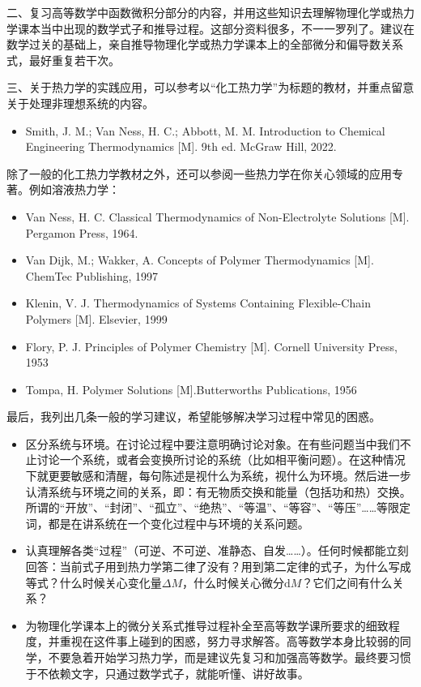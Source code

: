 \documentclass[main.tex]{subfiles}
\begin{document}
二、复习高等数学中函数微积分部分的内容，并用这些知识去理解物理化学或热力学课本当中出现的数学式子和推导过程。这部分资料很多，不一一罗列了。建议在数学过关的基础上，亲自推导物理化学或热力学课本上的全部微分和偏导数关系式，最好重复若干次。

三、关于热力学的实践应用，可以参考以“化工热力学”为标题的教材，并重点留意关于处理非理想系统的内容。
\begin{itemize}
  \item Smith, J. M.; Van Ness, H. C.; Abbott, M. M. Introduction to Chemical Engineering Thermodynamics [M]. 9th ed. McGraw Hill, 2022.
\end{itemize}
除了一般的化工热力学教材之外，还可以参阅一些热力学在你关心领域的应用专著。例如溶液热力学：
\begin{itemize}
  \item Van Ness, H. C. Classical Thermodynamics of Non-Electrolyte Solutions [M]. Pergamon Press, 1964.
  \item Van Dijk, M.; Wakker, A. Concepts of Polymer Thermodynamics [M]. ChemTec Publishing, 1997
  \item Klenin, V. J. Thermodynamics of Systems Containing Flexible-Chain Polymers [M]. Elsevier, 1999
  \item Flory, P. J. Principles of Polymer Chemistry [M]. Cornell University Press, 1953
  \item Tompa, H. Polymer Solutions [M].Butterworths Publications, 1956
\end{itemize}

最后，我列出几条一般的学习建议，希望能够解决学习过程中常见的困惑。
\begin{itemize}
  \item 区分系统与环境。在讨论过程中要注意明确讨论对象。在有些问题当中我们不止讨论一个系统，或者会变换所讨论的系统（比如相平衡问题）。在这种情况下就更要敏感和清醒，每句陈述是视什么为系统，视什么为环境。然后进一步认清系统与环境之间的关系，即：有无物质交换和能量（包括功和热）交换。所谓的“开放”、“封闭”、“孤立”、“绝热”、“等温”、“等容”、“等压”……等限定词，都是在讲系统在一个变化过程中与环境的关系问题。
  \item 认真理解各类“过程”（可逆、不可逆、准静态、自发……）。任何时候都能立刻回答：当前式子用到热力学第二律了没有？用到第二定律的式子，为什么写成等式？什么时候关心变化量$\Delta M$，什么时候关心微分$\mathrm{d}M$？它们之间有什么关系？
  \item 为物理化学课本上的微分关系式推导过程补全至高等数学课所要求的细致程度，并重视在这件事上碰到的困惑，努力寻求解答。高等数学本身比较弱的同学，不要急着开始学习热力学，而是建议先复习和加强高等数学。最终要习惯于不依赖文字，只通过数学式子，就能听懂、讲好故事。
\end{itemize}
\end{document}

